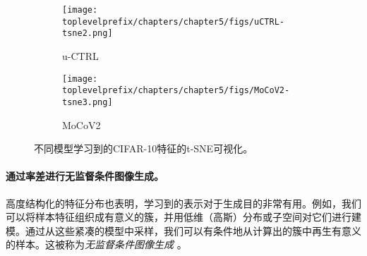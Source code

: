 \documentclass[../../book-main_zh.tex]{subfiles}
\begin{document}
\begin{figure}[ht!]
    \begin{subfigure}[t]{0.46\textwidth}
        \centering
        \texttt{[image: \\toplevelprefix/chapters/chapter5/figs/uCTRL-tsne2.png]}
        \caption{u-CTRL}
    \end{subfigure}
    \hfill
    \begin{subfigure}[t]{0.46\textwidth}
        \centering
        \texttt{[image: \\toplevelprefix/chapters/chapter5/figs/MoCoV2-tsne3.png]}
        \caption{MoCoV2}
    \end{subfigure}
    \caption{\small 不同模型学习到的CIFAR-10特征的t-SNE可视化。} 
    \label{fig:tsne}
\end{figure}

\paragraph{通过率差进行无监督条件图像生成。}
高度结构化的特征分布也表明，学习到的表示对于生成目的非常有用。例如，我们可以将样本特征组织成有意义的簇，并用低维（高斯）分布或子空间对它们进行建模。通过从这些紧凑的模型中采样，我们可以有条件地从计算出的簇中再生有意义的样本。这被称为{\em 无监督条件图像生成} \cite{hwang2021stein}。
\end{document}

